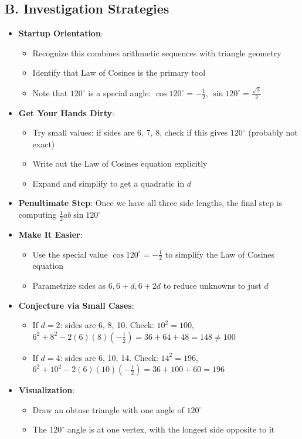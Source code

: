 \documentclass[12pt]{article}
\begin{document}
\begin{strategicbox}
\subsection*{B. Investigation Strategies}
\begin{itemize}[leftmargin=*]
    \item \textbf{Startup Orientation}: 
    \begin{itemize}
        \item Recognize this combines arithmetic sequences with triangle geometry
        \item Identify that Law of Cosines is the primary tool
        \item Note that $120^\circ$ is a special angle: $\cos 120^\circ = -\frac{1}{2}$, $\sin 120^\circ = \frac{\sqrt{3}}{2}$
    \end{itemize}
    \item \textbf{Get Your Hands Dirty}: 
    \begin{itemize}
        \item Try small values: if sides are 6, 7, 8, check if this gives $120^\circ$ (probably not exact)
        \item Write out the Law of Cosines equation explicitly
        \item Expand and simplify to get a quadratic in $d$
    \end{itemize}
    \item \textbf{Penultimate Step}: Once we have all three side lengths, the final step is computing $\frac{1}{2}ab\sin 120^\circ$
    \item \textbf{Make It Easier}: 
    \begin{itemize}
        \item Use the special value $\cos 120^\circ = -\frac{1}{2}$ to simplify the Law of Cosines equation
        \item Parametrize sides as $6, 6+d, 6+2d$ to reduce unknowns to just $d$
    \end{itemize}
    \item \textbf{Conjecture via Small Cases}: 
    \begin{itemize}
        \item If $d = 2$: sides are 6, 8, 10. Check: $10^2 = 100$, $6^2 + 8^2 - 2(6)(8)(-\frac{1}{2}) = 36 + 64 + 48 = 148 \neq 100$
        \item If $d = 4$: sides are 6, 10, 14. Check: $14^2 = 196$, $6^2 + 10^2 - 2(6)(10)(-\frac{1}{2}) = 36 + 100 + 60 = 196$ \checkmark
    \end{itemize}
    \item \textbf{Visualization}: 
    \begin{itemize}
        \item Draw an obtuse triangle with one angle of $120^\circ$
        \item The $120^\circ$ angle is at one vertex, with the longest side opposite to it
    \end{itemize}
\end{itemize}


\end{strategicbox}
\end{document}
